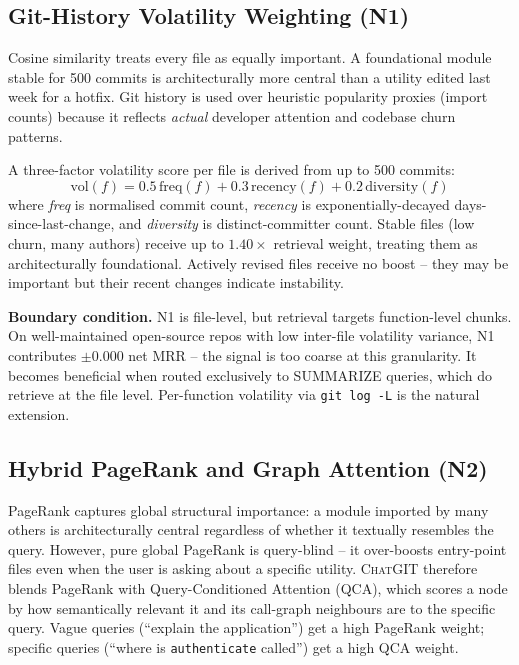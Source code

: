 \documentclass[conference]{IEEEtran}
\newcommand{\chatgit}{\textsc{ChatGIT}\xspace}
\begin{document}
\subsection{Git-History Volatility Weighting (N1)}

Cosine similarity treats every file as equally
important. A foundational module stable for 500 commits is architecturally
more central than a utility edited last week for a hotfix.
Git history is used over heuristic popularity proxies (import counts) because
it reflects \emph{actual} developer attention and codebase churn patterns.

A three-factor volatility score per file is derived from up to 500 commits:
\begin{equation}
\text{vol}(f) = 0.5\,\text{freq}(f) + 0.3\,\text{recency}(f) + 0.2\,\text{diversity}(f)
\end{equation}
where \textit{freq} is normalised commit count, \textit{recency} is
exponentially-decayed days-since-last-change, and \textit{diversity} is
distinct-committer count. Stable files (low churn, many authors) receive
up to $1.40\times$ retrieval weight, treating them as architecturally
foundational. Actively revised files receive no boost -- they may be
important but their recent changes indicate instability.

\textbf{Boundary condition.} N1 is file-level, but retrieval targets
function-level chunks. On well-maintained open-source repos with low
inter-file volatility variance, N1 contributes $\pm$0.000 net MRR --
the signal is too coarse at this granularity. It becomes beneficial when
routed exclusively to SUMMARIZE queries, which do retrieve at the file
level. Per-function volatility via \texttt{git log -L} is the natural
extension.

\subsection{Hybrid PageRank and Graph Attention (N2)}

PageRank captures global structural importance: a module
imported by many others is architecturally central regardless of
whether it textually resembles the query. However, pure global PageRank is
query-blind -- it over-boosts entry-point files even when the user is asking
about a specific utility. \chatgit therefore blends PageRank with Query-Conditioned
Attention (QCA), which scores a node by how semantically relevant it and its
call-graph neighbours are to the specific query. Vague queries (``explain
the application'') get a high PageRank weight; specific queries (``where is
\texttt{authenticate} called'') get a high QCA weight.
\end{document}

